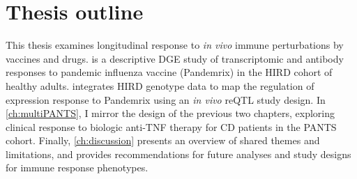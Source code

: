 %

\section{Thesis outline}

This thesis examines longitudinal response to \textit{in vivo} immune perturbations by vaccines and drugs.
 is a descriptive \gls{DGE} study of transcriptomic and antibody responses to pandemic influenza vaccine (Pandemrix) in the \gls{HIRD} cohort of healthy adults.
 integrates \gls{HIRD} genotype data to map the regulation of expression response to Pandemrix using an \textit{in vivo} \gls{reQTL} study design.
In \cref{ch:multiPANTS}, I mirror the design of the previous two chapters, 
exploring clinical response to biologic anti-\gls{TNF} therapy for \gls{CD} patients in the \gls{PANTS} cohort.
Finally, \cref{ch:discussion} presents an overview of shared themes and limitations,
and provides recommendations for future analyses and study designs for immune response phenotypes.
%
